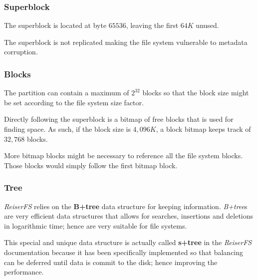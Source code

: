 
\begin{frame}
  \frametitle{Superblock}

  The superblock is located at byte $65536$, leaving the first $64K$ unused.

  \-

  The superblock is not replicated making the file system vulnerable to
  metadata corruption.
\end{frame}


\begin{frame}
  \frametitle{Blocks}

  The partition can contain a maximum of $2^{32}$ blocks so that the
  block size might be set according to the file system size factor.

  \-

  Directly following the superblock is a bitmap of free blocks that is used
  for finding space. As such, if the block size is $4,096K$, a block bitmap
  keeps track of $32,768$ blocks.

  \-

  More bitmap blocks might be necessary to reference all the file system
  blocks. Those blocks would simply follow the first bitmap block.
\end{frame}


\begin{frame}
  \frametitle{Tree}

  \textit{ReiserFS} relies on the \textbf{B+tree} data structure for keeping
  information. \textit{B+tree}s are very efficient data structures that allows
  for searches, insertions and deletions in logarithmic time; hence are very
  suitable for file systems.

  \-

  This special and unique data structure is actually called \textbf{s+tree}
  in the \textit{ReiserFS} documentation because it has been specifically
  implemented so that balancing can be deferred until data is commit to the
  disk; hence improving the performance.
\end{frame}


